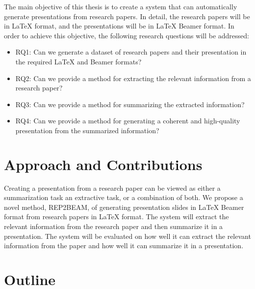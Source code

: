 The main objective of this thesis is to create a system that can automatically generate presentations from research papers. In detail, the research papers will be in \LaTeX{} format, and the presentations will be in \LaTeX{} Beamer format. In order to achieve this objective, the following research questions will be addressed:

\begin{itemize}
  \item RQ1: Can we generate a dataset of research papers and their presentation in the required \LaTeX{} and Beamer formats?
  \item RQ2: Can we provide a method for extracting the relevant information from a research paper?
  \item RQ3: Can we provide a method for summarizing the extracted information?
  \item RQ4: Can we provide a method for generating a coherent and high-quality presentation from the summarized information?
\end{itemize}

\section{Approach and Contributions}
\label{sec:intro:approach}


Creating a presentation from a research paper can be viewed as either a summarization task an extractive task, or a combination of both. We propose a novel method, REP2BEAM, of generating presentation slides in LaTeX Beamer format from research papers in LaTeX format. The system will extract the relevant information from the research paper and then summarize it in a presentation. The system will be evaluated on how well it can extract the relevant information from the paper and how well it can summarize it in a presentation.


\section{Outline}
\label{sec:intro:outline}

